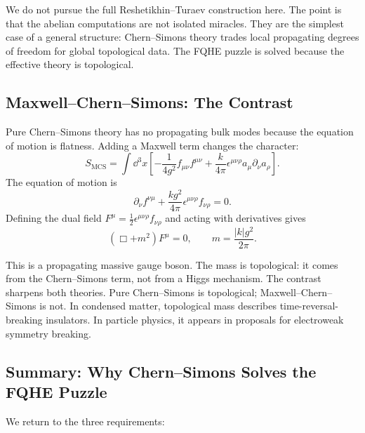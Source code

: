 We do not pursue the full Reshetikhin--Turaev construction here. The point is that the abelian computations are not isolated miracles. They are the simplest case of a general structure: Chern--Simons theory trades local propagating degrees of freedom for global topological data. The FQHE puzzle is solved because the effective theory is topological.

\subsection{Maxwell--Chern--Simons: The Contrast}
\label{subsec:fqhe-mcs-contrast}

Pure Chern--Simons theory has no propagating bulk modes because the equation of motion is flatness. Adding a Maxwell term changes the character:
\begin{equation}
  S_{\mathrm{MCS}}
  =
  \int\dd^3x\left[
  -\frac{1}{4g^2}f_{\mu\nu}f^{\mu\nu}
  +
  \frac{k}{4\pi}\epsilon^{\mu\nu\rho}a_\mu\partial_\nu a_\rho
  \right].
  \label{eq:fqhe-mcs-action}
\end{equation}
The equation of motion is
\begin{equation}
  \partial_\nu f^{\nu\mu}
  +
  \frac{k g^2}{4\pi}\epsilon^{\mu\nu\rho}f_{\nu\rho}
  =
  0.
  \label{eq:fqhe-mcs-eom}
\end{equation}
Defining the dual field $F^\mu=\frac12\epsilon^{\mu\nu\rho}f_{\nu\rho}$ and acting with derivatives gives
\begin{equation}
  (\Box+m^2)F^\mu=0,
  \qquad
  m=\frac{|k|g^2}{2\pi}.
  \label{eq:fqhe-mcs-mass}
\end{equation}

This is a propagating massive gauge boson. The mass is topological: it comes from the Chern--Simons term, not from a Higgs mechanism. The contrast sharpens both theories. Pure Chern--Simons is topological; Maxwell--Chern--Simons is not. In condensed matter, topological mass describes time-reversal-breaking insulators. In particle physics, it appears in proposals for electroweak symmetry breaking.

\subsection{Summary: Why Chern--Simons Solves the FQHE Puzzle}
\label{subsec:fqhe-summary}

We return to the three requirements:

